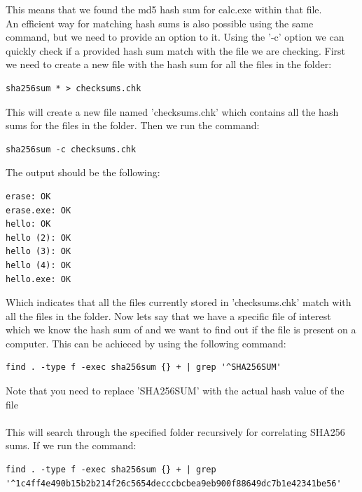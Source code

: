 \documentclass[a4paper,10pt,oneside]{article}
\begin{document}
This means that we found the md5 hash sum for calc.exe within that file.\\


An efficient way for matching hash sums is also possible using the same command, but we need to provide an option to it. Using the '-c' option
we can quickly check if a provided hash sum match with the file we are checking. First we need to create a new file with the hash sum for
all the files in the folder:

\begin{lstlisting}[caption= Save result in new file]
sha256sum * > checksums.chk
\end{lstlisting}

This will create a new file named 'checksums.chk' which contains all the hash sums for the files in the folder. Then we run the command:

\begin{lstlisting}[caption=Check if files in folder match with files in list]
sha256sum -c checksums.chk
\end{lstlisting}

The output should be the following:

\begin{lstlisting}[caption=Output from Example above]
erase: OK
erase.exe: OK
hello: OK
hello (2): OK
hello (3): OK
hello (4): OK
hello.exe: OK
\end{lstlisting}

Which indicates that all the files currently stored in 'checksums.chk' match with all the files in the folder.
Now lets say that we have a specific file of interest which we know the hash sum of and we want to find out if the file is present on a computer.
This can be achieced by using the following command:

\begin{lstlisting}[caption= Command for finding file with hash sum]
find . -type f -exec sha256sum {} + | grep '^SHA256SUM'
\end{lstlisting}

{\footnotesize *Note that you need to replace 'SHA256SUM' with the actual hash value of the file}\\\\
This will search through the specified folder recursively for correlating SHA256 sums. If we run the command:

\begin{lstlisting}[caption=Finding files with hash sum]
find . -type f -exec sha256sum {} + | grep '^1c4ff4e490b15b2b214f26c5654decccbcbea9eb900f88649dc7b1e42341be56'
\end{lstlisting}
\end{document}
